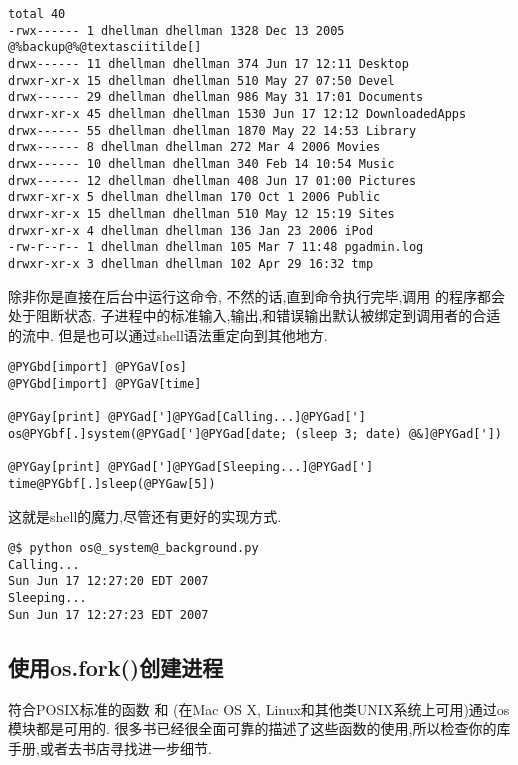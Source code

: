 \documentclass[letterpaper,10pt,english]{manual}
\begin{document}
\begin{Verbatim}[commandchars=@\[\]]
total 40
-rwx------ 1 dhellman dhellman 1328 Dec 13 2005 @%backup@%@textasciitilde[]
drwx------ 11 dhellman dhellman 374 Jun 17 12:11 Desktop
drwxr-xr-x 15 dhellman dhellman 510 May 27 07:50 Devel
drwx------ 29 dhellman dhellman 986 May 31 17:01 Documents
drwxr-xr-x 45 dhellman dhellman 1530 Jun 17 12:12 DownloadedApps
drwx------ 55 dhellman dhellman 1870 May 22 14:53 Library
drwx------ 8 dhellman dhellman 272 Mar 4 2006 Movies
drwx------ 10 dhellman dhellman 340 Feb 14 10:54 Music
drwx------ 12 dhellman dhellman 408 Jun 17 01:00 Pictures
drwxr-xr-x 5 dhellman dhellman 170 Oct 1 2006 Public
drwxr-xr-x 15 dhellman dhellman 510 May 12 15:19 Sites
drwxr-xr-x 4 dhellman dhellman 136 Jan 23 2006 iPod
-rw-r--r-- 1 dhellman dhellman 105 Mar 7 11:48 pgadmin.log
drwxr-xr-x 3 dhellman dhellman 102 Apr 29 16:32 tmp
\end{Verbatim}

除非你是直接在后台中运行这命令, 不然的话,直到命令执行完毕,调用  的程序都会处于阻断状态. 子进程中的标准输入,输出,和错误输出默认被绑定到调用者的合适的流中. 但是也可以通过shell语法重定向到其他地方.

\begin{Verbatim}[commandchars=@\[\]]
@PYGbd[import] @PYGaV[os]
@PYGbd[import] @PYGaV[time]

@PYGay[print] @PYGad[']@PYGad[Calling...]@PYGad[']
os@PYGbf[.]system(@PYGad[']@PYGad[date; (sleep 3; date) @&]@PYGad['])

@PYGay[print] @PYGad[']@PYGad[Sleeping...]@PYGad[']
time@PYGbf[.]sleep(@PYGaw[5])
\end{Verbatim}

这就是shell的魔力,尽管还有更好的实现方式.

\begin{Verbatim}[commandchars=@\[\]]
@$ python os@_system@_background.py
Calling...
Sun Jun 17 12:27:20 EDT 2007
Sleeping...
Sun Jun 17 12:27:23 EDT 2007
\end{Verbatim}


\subsection{使用os.fork()创建进程}

符合POSIX标准的函数  和  (在Mac OS X, Linux和其他类UNIX系统上可用)通过os模块都是可用的. 很多书已经很全面可靠的描述了这些函数的使用,所以检查你的库手册,或者去书店寻找进一步细节.
\end{document}
